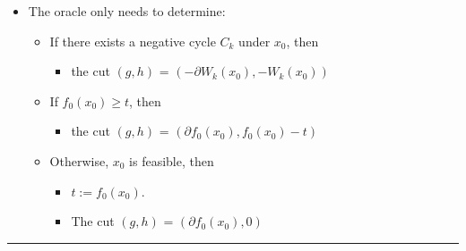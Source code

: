 \documentclass[]{article}
\providecommand{\tightlist}{%
  \setlength{\itemsep}{0pt}\setlength{\parskip}{0pt}}
\begin{document}
\begin{itemize}
\tightlist
\item
  The oracle only needs to determine:

  \begin{itemize}
  \tightlist
  \item
    If there exists a negative cycle \(C_k\) under \(x_0\), then

    \begin{itemize}
    \tightlist
    \item
      the cut \((g, h)\) = \((-\partial W_k(x_0), -W_k(x_0))\)
    \end{itemize}
  \item
    If \(f_0(x_0) \geq t\), then

    \begin{itemize}
    \tightlist
    \item
      the cut \((g, h)\) = \((\partial f_0(x_0), f_0(x_0) - t)\)
    \end{itemize}
  \item
    Otherwise, \(x_0\) is feasible, then

    \begin{itemize}
    \tightlist
    \item
      \(t := f_0(x_0)\).
    \item
      The cut \((g, h)\) = \((\partial f_0(x_0), 0)\)
    \end{itemize}
  \end{itemize}
\end{itemize}

\begin{center}\rule{0.5\linewidth}{\linethickness}\end{center}
\end{document}
